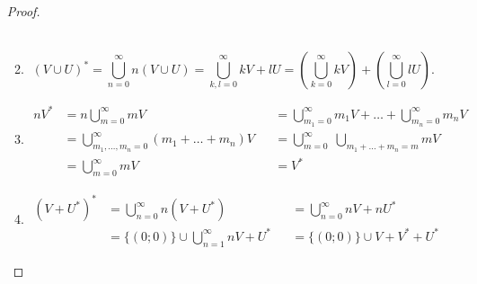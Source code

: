 \documentclass[12pt,a4paper]{article}
\begin{document}
\begin{problem}{8}
\begin{enumerate}
\begin{proof}
\begin{enumerate}
\begin{align*}
                            \end{align*}
                        \item
                            \[
                                (V \cup U)^*
                                = \bigcup_{n=0}^\infty n(V \cup U)
                                = \bigcup_{k,l=0}^\infty kV + lU
                                = \left(\bigcup_{k=0}^\infty kV\right) + \left(\bigcup_{l=0}^\infty lU\right).
                            \]
                        \item
                            \begin{align*}
                                nV^*
                                &= n \bigcup_{m=0}^\infty mV&
                                &= \bigcup_{m_1 = 0}^\infty m_1 V + \dots + \bigcup_{m_n = 0}^\infty m_n V\\
                                &= \bigcup_{m_1, \dots, m_n = 0}^\infty (m_1 + \dots + m_n)V&
                                &= \bigcup_{m = 0}^\infty \; \bigcup_{m_1 + \dots + m_n = m} mV\\
                                &= \bigcup_{m = 0}^\infty mV&
                                &= V^*
                            \end{align*}
                        \item
                            \begin{align*}
                                (V + U^*)^*
                                &= \bigcup_{n=0}^\infty n(V + U^*)&
                                &= \bigcup_{n=0}^\infty nV + nU^*\\
                                &= \{(0; 0)\} \cup \bigcup_{n=1}^\infty nV + U^*&
                                &= \{(0; 0)\} \cup V + V^* + U^*
                            \end{align*}
                    \end{enumerate}
                \end{proof}


\end{enumerate}
\end{problem}
\end{document}
